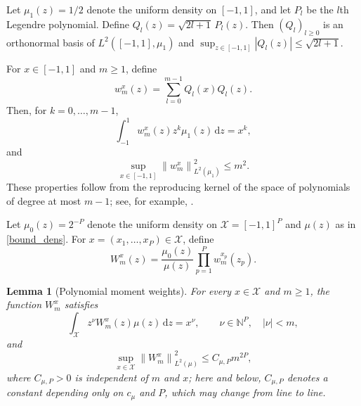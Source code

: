\documentclass[11pt]{article}
\numberwithin{equation}{section}
\theoremstyle{plain}
\newtheorem{lemma}[theorem]{Lemma}
\theoremstyle{definition}
\theoremstyle{remark}
\newcommand{\X}{\mathcal{X}}
\newcommand{\norm}[1]{\left\lVert#1\right\rVert}
\begin{document}
Let $\mu_1(z)=1/2$ denote the uniform density on $[-1,1]$, and let $P_l$ be
the $l$th Legendre polynomial. Define
$Q_l(z)=\sqrt{2l+1}\,P_l(z)$. Then $(Q_l)_{l\geq0}$ is an orthonormal basis of
$L^2([-1,1],\mu_1)$ and
$\sup_{z\in[-1,1]}|Q_l(z)|\leq\sqrt{2l+1}$.

For $x\in[-1,1]$ and $m\geq1$, define
\[
w_m^x(z)
=
\sum_{l=0}^{m-1}Q_l(x)Q_l(z).
\]
Then, for $k=0,\ldots,m-1$,
\begin{equation}
\int_{-1}^1w_m^x(z)z^k\mu_1(z)\,\mathrm{d}z
=
x^k,
\label{eq:moment}
\end{equation}
and
\begin{equation}
\sup_{x\in[-1,1]}
\norm{w_m^x}_{L^2(\mu_1)}^2
\leq m^2.
\label{eq:uniform}
\end{equation}
These properties follow from the reproducing kernel of the space of
polynomials of degree at most $m-1$; see, for example,
\cite{dommel2024bound}.

Let $\mu_0(z)=2^{-P}$ denote the uniform density on
$\X=[-1,1]^P$ and $\mu(z)$ as in \eqref{bound_dens}. For $x=(x_1,\ldots,x_P)\in\X$, define
\begin{equation}
W_m^x(z)
=
\frac{\mu_0(z)}{\mu(z)}
\prod_{p=1}^P w_m^{x_p}(z_p).
\label{eq:def_weight_multidim}
\end{equation}

\begin{lemma}[Polynomial moment weights]
\label{lem:polynomial_weights}
For every $x\in\X$ and $m\geq1$, the function $W_m^x$ satisfies
\begin{equation}
\int_{\X}z^\nu W_m^x(z)\mu(z)\,\mathrm{d}z
=
x^\nu,
\qquad
\nu\in\mathbb{N}^P,\quad |\nu|<m,
\label{eq:moment_multidim}
\end{equation}
and
\begin{equation}
\sup_{x\in\X}
\norm{W_m^x}_{L^2(\mu)}^2
\leq
C_{\mu,P}m^{2P},
\label{eq:l2_bound_multidim}
\end{equation}
where $C_{\mu,P}>0$ is independent of $m$ and $x$; here and below, $C_{\mu,P}$ denotes a constant depending only on $c_\mu$ and $P$, which may change from line to line.
\end{lemma}
\end{document}
